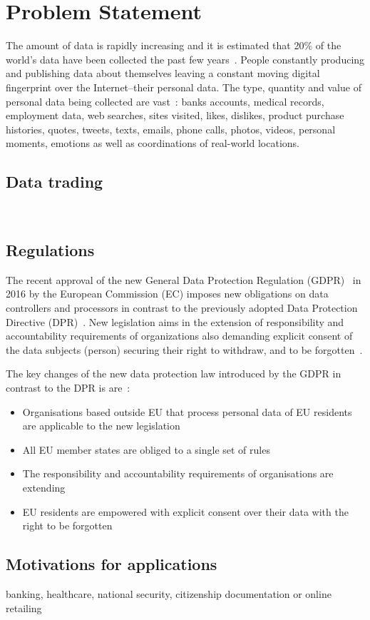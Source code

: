 \chapter{Problem Statement}
\label{problem}

The amount of data is rapidly increasing and it is estimated that 20\% of the world's data have been collected the past
few years~\cite{10.1109/SPW.2015.27,big_data_better_worse}. People constantly producing and publishing data about themselves
leaving a constant moving digital fingerprint over the Internet--their personal data. The type, quantity and value of personal data
being collected are vast~\cite{emergence_new_assets_wef}: banks accounts, medical records, employment data, web searches, sites visited,
likes, dislikes, product purchase histories, quotes, tweets, texts, emails, phone calls, photos, videos, personal moments, emotions
as well as coordinations of real-world locations.


\section{Data trading}\label{problem:data_trading}

~\cite{emergence_new_assets_wef}

\section{Regulations}\label{problem:regulations}

The recent approval of the new General Data Protection Regulation (GDPR)~\cite{gdpr} in 2016 by the European Commission (EC)
imposes new obligations on data controllers and processors in contrast to the previously adopted Data Protection Directive (DPR)~\cite{eu-46ec-1995}.
New legislation aims in the extension of responsibility and accountability requirements of organizations also demanding explicit
consent of the data subjects (person) securing their right to withdraw, and to be forgotten~\cite{DBLP:journals/corr/NeisseSF17}.

The key changes of the new data protection law introduced by the GDPR in contrast to the DPR is are~\cite{DBLP:journals/corr/NeisseSF17}:
\begin{itemize}
    \item Organisations based outside EU that process personal data of EU residents are applicable to the new legislation
    \item All EU member states are obliged to a single set of rules
    \item The responsibility and accountability requirements of organisations are extending
    \item EU residents are empowered with explicit consent over their data with the right to be forgotten
\end{itemize}



\section{Motivations for applications}\label{problem:motivations}

banking, healthcare, national security, citizenship documentation or online retailing

